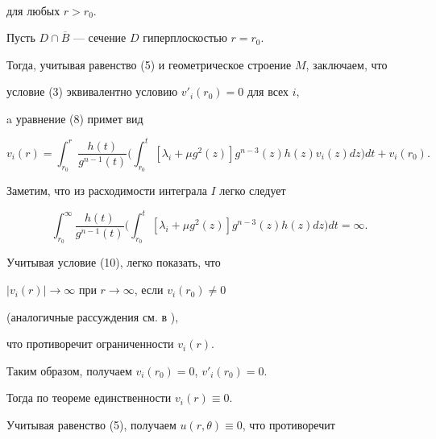 \begin{pf}
\begin{gather}
\end{gather}


%


для любых $r > r_0 $.





Пусть $D\cap \overline {B}$ --- сечение $D$ гиперплоскостью $r=r_0$.


Тогда, учитывая равенство (5) и геометрическое строение $M$, заключаем, что


условие (3) эквивалентно условию $v'_i(r_0)=0$ для всех $i$,


a уравнение (8) примет вид


%


\begin{equation}


v_i(r)=\int_{r_0}^{r}\frac{h(t)}{g^{n-1}(t)} \biggl(


\int_{r_0}^{t}[\lambda_i + \mu g^2(z)]g^{n-3}(z)


h(z)v_i(z)dz \biggr)dt + v_i(r_0).


\end{equation}


%





Заметим, что из расходимости интеграла $I$ легко следует


%


\begin{equation}


\int_{r_0}^{\infty}\frac{h(t)}{g^{n-1}(t)}\biggl(\int_{r_0}^{t}


[\lambda_i + \mu g^2(z)] g^{n-3}(z)h(z)dz \biggr) dt = \infty.


\end{equation}


%





Учитывая условие (10), легко показать, что 


$|v_i(r)| \to \infty$ при $r \to \infty$, если $v_i(r_0)\ne 0$


(аналогичные рассуждения см. в \cite{Los}),


что противоречит ограниченности $v_i(r)$.


Таким образом, получаем $v_i(r_0)=0$, $v'_i(r_0)=0$.


Тогда по теореме единственности $v_i(r)\equiv 0$.


Учитывая равенство (5), получаем $u(r,\theta)\equiv 0$, что противоречит



\end{pf}
